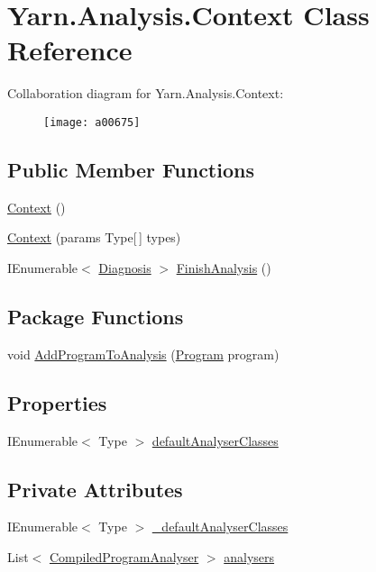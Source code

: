 \hypertarget{a00054}{\section{Yarn.\-Analysis.\-Context Class Reference}
\label{a00054}
}


Collaboration diagram for Yarn.\-Analysis.\-Context\-:
\nopagebreak
\begin{figure}[H]
\begin{center}
\leavevmode
\texttt{[image: a00675]}
\end{center}
\end{figure}
\subsection*{Public Member Functions}
\begin{DoxyCompactItemize}
\item 
\hyperlink{a00054_a8e2c56843e8d374b0f90e23326d8d14a}{Context} ()
\item 
\hyperlink{a00054_ad5f41fb64637c4938bce811153492731}{Context} (params Type\mbox{[}$\,$\mbox{]} types)
\item 
I\-Enumerable$<$ \hyperlink{a00087}{Diagnosis} $>$ \hyperlink{a00054_a1eadea062a5899a64d00ea0172cbbb43}{Finish\-Analysis} ()
\end{DoxyCompactItemize}
\subsection*{Package Functions}
\begin{DoxyCompactItemize}
\item 
void \hyperlink{a00054_a60255a6d54f296d199507acef251244c}{Add\-Program\-To\-Analysis} (\hyperlink{a00138}{Program} program)
\end{DoxyCompactItemize}
\subsection*{Properties}
\begin{DoxyCompactItemize}
\item 
I\-Enumerable$<$ Type $>$ \hyperlink{a00054_afdf24f2512251c2203ba1bde8f4a0f90}{default\-Analyser\-Classes}
\end{DoxyCompactItemize}
\subsection*{Private Attributes}
\begin{DoxyCompactItemize}
\item 
I\-Enumerable$<$ Type $>$ \hyperlink{a00054_ad06829cf848a5936db5724ebced758ec}{\-\_\-default\-Analyser\-Classes}
\item 
List$<$ \hyperlink{a00050}{Compiled\-Program\-Analyser} $>$ \hyperlink{a00054_aa5c7eaa90ad9c47969a3b336080d8991}{analysers}
\end{DoxyCompactItemize}


